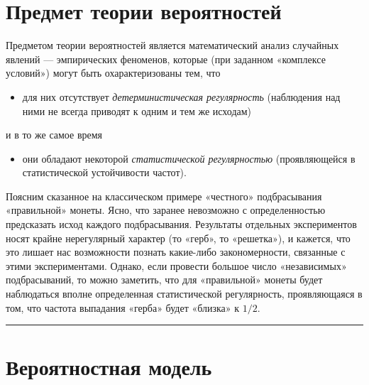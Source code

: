 \documentclass[11pt,a4paper]{article}
\renewcommand{\linethickness}{0.1ex}
\providecommand{\tightlist}{%
      \setlength{\itemsep}{0pt}\setlength{\parskip}{0pt}}
\begin{document}
    \hypertarget{ux43fux440ux435ux434ux43cux435ux442-ux442ux435ux43eux440ux438ux438-ux432ux435ux440ux43eux44fux442ux43dux43eux441ux442ux435ux439}{%
\section{Предмет теории
вероятностей}\label{ux43fux440ux435ux434ux43cux435ux442-ux442ux435ux43eux440ux438ux438-ux432ux435ux440ux43eux44fux442ux43dux43eux441ux442ux435ux439}}

Предметом теории вероятностей является математический анализ случайных
явлений --- эмпирических феноменов, которые (при заданном «комплексе
условий») могут быть охарактеризованы тем, что

\begin{itemize}
\tightlist
\item
  для них отсутствует \emph{детерминистическая регулярность} (наблюдения
  над ними не всегда приводят к одним и тем же исходам)
\end{itemize}

и в то же самое время

\begin{itemize}
\tightlist
\item
  они обладают некоторой \emph{статистической регулярностью}
  (проявляющейся в статистической устойчивости частот).
\end{itemize}

Поясним сказанное на классическом примере «честного» подбрасывания
«правильной» монеты. Ясно, что заранее невозможно с определенностью
предсказать исход каждого подбрасывания. Результаты отдельных
экспериментов носят крайне нерегулярный характер (то «герб», то
«решетка»), и кажется, что это лишает нас возможности познать какие-либо
закономерности, связанные с этими экспериментами. Однако, если провести
большое число «независимых» подбрасываний, то можно заметить, что для
«правильной» монеты будет наблюдаться вполне определенная статистической
регулярность, проявляющаяся в том, что частота выпадания «герба» будет
«близка» к \(1/2\).

    \begin{center}\rule{0.5\linewidth}{\linethickness}\end{center}

    \hypertarget{ux432ux435ux440ux43eux44fux442ux43dux43eux441ux442ux43dux430ux44f-ux43cux43eux434ux435ux43bux44c}{%
\section{Вероятностная
модель}\label{ux432ux435ux440ux43eux44fux442ux43dux43eux441ux442ux43dux430ux44f-ux43cux43eux434ux435ux43bux44c}}
\end{document}
